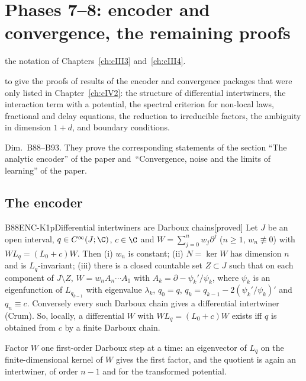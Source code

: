 \documentclass[11pt,a4paper,oneside]{report}
\newcommand{\chapterbrief}[3]{\begin{leadin}\begin{description}[itemsep=3pt,leftmargin=3.1cm,labelwidth=2.9cm,font=\sffamily\bfseries\small]
  \item[Starting from] #1
  \item[Why] #2
  \item[Role] #3
  \end{description}\end{leadin}}
\newcommand{\badge}[2]{\textcolor{#1}{\textsf{\footnotesize[#2]}}}
\newcommand{\proved}{\badge{cC}{proved}}
\newenvironment{dimcard}[5]{\par\Needspace{12\baselineskip}\begin{dimcardbox}{#1}{#2}{#3}{#4}{#5}}{\end{dimcardbox}}
\begin{document}
\chapter[Encoder and convergence: more proofs]{Phases 7--8: encoder and convergence, the remaining proofs}\label{ch:cIV6}
\chapterbrief
{the notation of Chapters~\ref{ch:cIII3} and~\ref{ch:cIII4}.}
{to give the proofs of results of the encoder and convergence packages that were only listed in Chapter~\ref{ch:cIV2}: the structure of differential intertwiners, the interaction term with a potential, the spectral criterion for non-local laws, fractional and delay equations, the reduction to irreducible factors, the ambiguity in dimension $1+d$, and boundary conditions.}
{Dim.~B88--B93. They prove the corresponding statements of the section ``The analytic encoder'' of the paper and~``Convergence, noise and the limits of learning'' of the paper.}

\section{The encoder}

\begin{dimcard}{B88}{ENC-K1p}{Differential intertwiners are Darboux chains}{\proved}{}
Let $J$ be an open interval, $q\in C^\infty(J;\C)$, $c\in\C$ and $W=\sum_{j=0}^nw_j\partial^j$ ($n\ge1$, $w_n\not\equiv0$) with $WL_q=(L_0+c)W$. Then (i) $w_n$ is constant; (ii) $N=\ker W$ has dimension $n$ and is $L_q$-invariant; (iii) there is a closed countable set $Z\subset J$ such that on each component of $J\setminus Z$, $W=w_nA_n\cdots A_1$ with $A_k=\partial-\psi_k'/\psi_k$, where $\psi_k$ is an eigenfunction of $L_{q_{k-1}}$ with eigenvalue $\lambda_k$, $q_0=q$, $q_k=q_{k-1}-2(\psi_k'/\psi_k)'$ and $q_n\equiv c$. Conversely every such Darboux chain gives a differential intertwiner (Crum). So, locally, a differential $W$ with $WL_q=(L_0+c)W$ exists iff $q$ is obtained from $c$ by a finite Darboux chain.
\end{dimcard}

\begin{proofidea}
Factor $W$ one first-order Darboux step at a time: an eigenvector of $L_q$ on the finite-dimensional kernel of $W$ gives the first factor, and the quotient is again an intertwiner, of order $n-1$ and for the transformed potential.
\end{proofidea}
\end{document}
